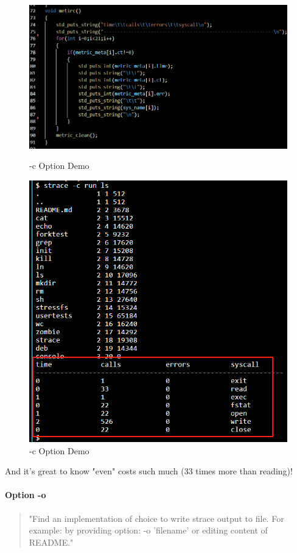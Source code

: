 \documentclass[11pt,oneside,a4paper]{article}
\begin{document}
\begin{figure}[H]
    \includegraphics[width=4.75in]{1-31.png}
    \centering
    \caption{-c Option Demo}
    \includegraphics[width=4.75in]{1-32.png}
    \centering
    \caption{-c Option Demo}
\end{figure}
And it's great to know "even" costs such much (33 times more than reading)!

\paragraph*{Option -o}
\begin{quotation}
    "Find an implementation of choice to write strace output to file.
    For example: by providing option: -o 'filename' or editing content of README."
\end{quotation}
\end{document}
